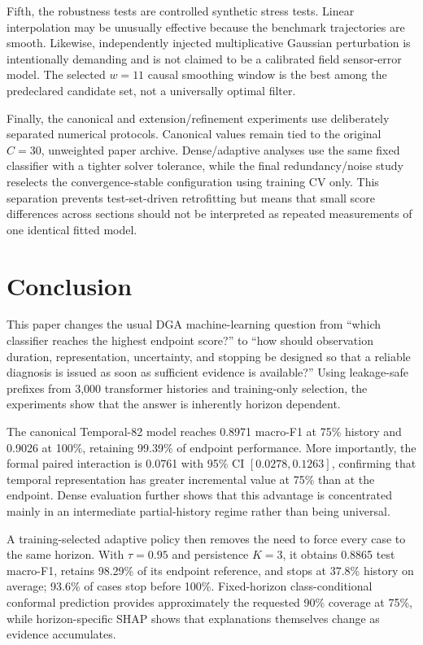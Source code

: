 \documentclass[conference]{IEEEtran}
\begin{document}
Fifth, the robustness tests are controlled synthetic stress tests. Linear interpolation may be unusually effective because the benchmark trajectories are smooth. Likewise, independently injected multiplicative Gaussian perturbation is intentionally demanding and is not claimed to be a calibrated field sensor-error model. The selected $w=11$ causal smoothing window is the best among the predeclared candidate set, not a universally optimal filter.

Finally, the canonical and extension/refinement experiments use deliberately separated numerical protocols. Canonical values remain tied to the original $C=30$, unweighted paper archive. Dense/adaptive analyses use the same fixed classifier with a tighter solver tolerance, while the final redundancy/noise study reselects the convergence-stable configuration using training CV only. This separation prevents test-set-driven retrofitting but means that small score differences across sections should not be interpreted as repeated measurements of one identical fitted model.

\section{Conclusion}
This paper changes the usual DGA machine-learning question from ``which classifier reaches the highest endpoint score?'' to ``how should observation duration, representation, uncertainty, and stopping be designed so that a reliable diagnosis is issued as soon as sufficient evidence is available?'' Using leakage-safe prefixes from 3,000 transformer histories and training-only selection, the experiments show that the answer is inherently horizon dependent.

The canonical Temporal-82 model reaches 0.8971 macro-F1 at 75\% history and 0.9026 at 100\%, retaining 99.39\% of endpoint performance. More importantly, the formal paired interaction is 0.0761 with 95\% CI $[0.0278,0.1263]$, confirming that temporal representation has greater incremental value at 75\% than at the endpoint. Dense evaluation further shows that this advantage is concentrated mainly in an intermediate partial-history regime rather than being universal.

A training-selected adaptive policy then removes the need to force every case to the same horizon. With $\tau=0.95$ and persistence $K=3$, it obtains 0.8865 test macro-F1, retains 98.29\% of its endpoint reference, and stops at 37.8\% history on average; 93.6\% of cases stop before 100\%. Fixed-horizon class-conditional conformal prediction provides approximately the requested 90\% coverage at 75\%, while horizon-specific SHAP shows that explanations themselves change as evidence accumulates.
\end{document}
